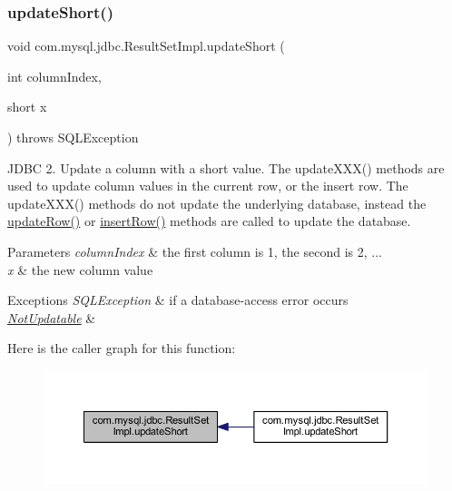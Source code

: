 \subsubsection{\texorpdfstring{update\+Short()}{updateShort()}\hspace{0.1cm}{\footnotesize\ttfamily [1/2]}}
{\footnotesize\ttfamily void com.\+mysql.\+jdbc.\+Result\+Set\+Impl.\+update\+Short (\begin{DoxyParamCaption}\item[{int}]{column\+Index,  }\item[{short}]{x }\end{DoxyParamCaption}) throws S\+Q\+L\+Exception}

J\+D\+BC 2. Update a column with a short value. The update\+X\+X\+X() methods are used to update column values in the current row, or the insert row. The update\+X\+X\+X() methods do not update the underlying database, instead the \mbox{\hyperlink{classcom_1_1mysql_1_1jdbc_1_1_result_set_impl_a2842d32292d023aaeeafedeed3322981}{update\+Row()}} or \mbox{\hyperlink{classcom_1_1mysql_1_1jdbc_1_1_result_set_impl_a78e304e3279cbcf60392f18c1385e3bf}{insert\+Row()}} methods are called to update the database.


\begin{DoxyParams}{Parameters}
{\em column\+Index} & the first column is 1, the second is 2, ... \\
\hline
{\em x} & the new column value\\
\hline
\end{DoxyParams}

\begin{DoxyExceptions}{Exceptions}
{\em S\+Q\+L\+Exception} & if a database-\/access error occurs \\
\hline
{\em \mbox{\hyperlink{classcom_1_1mysql_1_1jdbc_1_1_not_updatable}{Not\+Updatable}}} & \\
\hline
\end{DoxyExceptions}
Here is the caller graph for this function\+:
\nopagebreak
\begin{figure}[H]
\begin{center}
\leavevmode
\includegraphics[width=350pt]{classcom_1_1mysql_1_1jdbc_1_1_result_set_impl_a4856eb4ba75f201ec478c09b5e7af025_icgraph}
\end{center}
\end{figure}
\mbox{\label{classcom_1_1mysql_1_1jdbc_1_1_result_set_impl_a0d4de94cc75212c90c107188c0193456}} 
